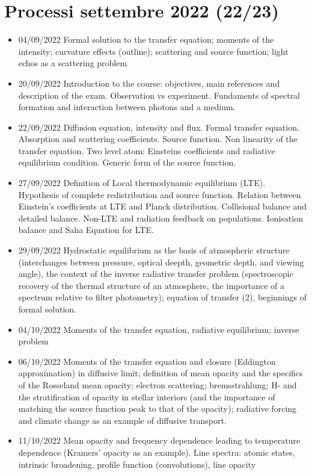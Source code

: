\section{Processi settembre 2022 (22/23)}

\begin{itemize}
    \item 04/09/2022 Formal solution to the transfer equation; moments of the intensity; curvature effects (outline); scattering and source function; light echos as a scattering problem 
    \item 20/09/2022 Introduction to the course: objectives, main references and description of the exam. Observation vs experiment. Fundaments of spectral formation and interaction between photons and a medium.
    \item 22/09/2022 Diffusion equation, intensity and flux. Formal transfer equation. Absorption and scattering coefficients. Source function. Non linearity of the transfer equation. Two level atom: Einsteins coefficients and radiative equilibrium condition. Generic form of the source function. 
    \item 27/09/2022 Definition of Local thermodynamic equilibrium (LTE). Hypothesis of complete redistribution and source function. Relation between Einstein's coefficients at LTE and Planck distribution. Collisional balance and detailed balance. Non-LTE and radiation feedback on populations. Ionisation balance and Saha Equation for LTE. 
    \item 29/09/2022 Hydrostatic equilibrium as the basis of atmospheric structure (interchanges between pressure, optical deepth, geometric depth, and viewing angle), the context of the inverse radiative transfer problem (spectroscopic recovery of the thermal structure of an atmosphere, the importance of a spectrum relative to filter photometry); equation of transfer (2), beginnings of formal solution. 
    \item 04/10/2022 Moments of the transfer equation, radiative equilibrium; inverse problem 
    \item 06/10/2022 Moments of the transfer equation and closure (Eddington approximation) in diffusive limit; definition of mean opacity and the specifics of the Rosseland mean opacity; electron scattering; bremsstrahlung; H- and the stratification of opacity in stellar interiors (and the importance of matching the source function peak to that of the opacity); radiative forcing and climate change as an example of diffusive transport. 
    \item 11/10/2022 Mean opacity and frequency dependence leading to temperature dependence (Kramers' opacity as an example). Line spectra: atomic states, intrinsic broadening, profile function (convolutions), line opacity 

\end{itemize}
